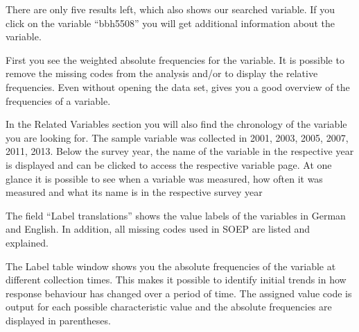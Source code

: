 \documentclass[letterpaper,10pt,openany,onesideH,english]{sphinxmanual}
\begin{document}
\begin{figure}[H]
\centering

\noindent{}
\end{figure}

There are only five results left, which also shows our searched variable. If you click on the variable “bbh5508” you will get additional information about the variable.

\begin{figure}[H]
\centering

\noindent{}
\end{figure}

First you see the weighted absolute frequencies for the variable. It is possible to remove the missing codes from the analysis and/or to display the relative frequencies. Even without opening the data set,  gives you a good overview of the frequencies of a variable.

\begin{figure}[H]
\centering

\noindent{}
\end{figure}

In the Related Variables section you will also find the chronology of the variable you are looking for. The sample variable was collected in 2001, 2003, 2005, 2007, 2011, 2013. Below the survey year, the name of the variable in the respective year is displayed and can be clicked to access the respective variable page. At one glance it is possible to see when a variable was measured, how often it was measured and what its name is in the respective survey year

\begin{figure}[H]
\centering

\noindent{}
\end{figure}

The field “Label translations” shows the value labels of the variables in German and English. In addition, all missing codes used in SOEP are listed and explained.

\begin{figure}[H]
\centering

\noindent{}
\end{figure}

The Label table window shows you the absolute frequencies of the variable at different collection times. This makes it possible to identify initial trends in how response behaviour has changed over a period of time. The assigned value code is output for each possible characteristic value and the absolute frequencies are displayed in parentheses.
\end{document}
